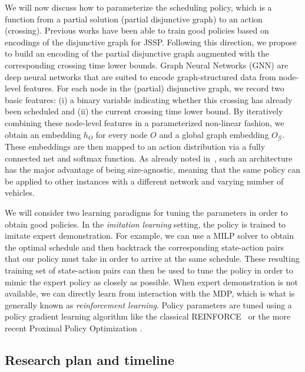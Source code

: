\documentclass{article}
\theoremstyle{definition}
\theoremstyle{plain}
\begin{document}
We will now discuss how to parameterize the scheduling policy, which is a
function from a partial solution (partial disjunctive graph) to an action
(crossing).
Previous works have been able to train good policies based on encodings of the
disjunctive graph for JSSP. Following this direction, we propose to build
an encoding of the partial disjunctive graph augmented with the corresponding
crossing time lower bounds.
%
Graph Neural Networks (GNN) are deep neural networks that are suited to encode
graph-structured data from node-level features. For each node in the (partial)
disjunctive graph, we record two basic features: (i) a binary variable
indicating whether this crossing has already been scheduled and (ii) the current
crossing time lower bound. By iteratively combining these node-level features in
a parameterized non-linear fashion, we obtain an embedding $h_{O}$ for every
node $O$ and a global graph embedding $O_{\mathcal{G}}$. These embeddings are
then mapped to an action distribution via a fully connected net and softmax
function.
As already noted in~\cite{zhangLearningDispatchJob2020}, such an architecture has the major advantage of being
size-agnostic, meaning that the same policy can be applied to other instances
with a different network and varying number of vehicles.

We will consider two learning paradigms for tuning the parameters in order to
obtain good policies. In the \textit{imitation learning} setting, the policy is
trained to imitate expert demonstration. For example, we can use a MILP solver
to obtain the optimal schedule and then backtrack the corresponding state-action
pairs that our policy must take in order to arrive at the same schedule. These
resulting training set of state-action pairs can then be used to tune the policy
in order to mimic the expert policy as closely as possible.
When expert demonstration is not available, we can directly learn from
interaction with the MDP, which is what is generally known as \textit{reinforcement
  learning}. Policy parameters are tuned using a policy gradient
learning algorithm like the classical REINFORCE~\cite{10.1007/BF00992696} or the
more recent Proximal Policy Optimization
\cite{schulmanProximalPolicyOptimization2017}.


\subsection{Research plan and timeline}
\end{document}
